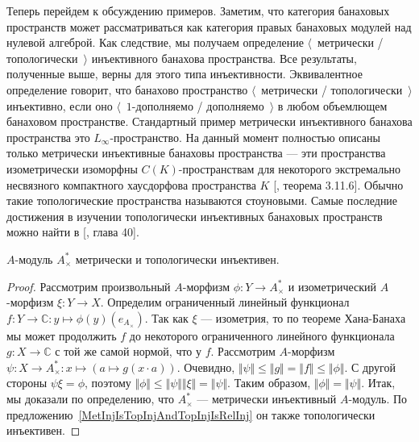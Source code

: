 Теперь перейдем к обсуждению примеров. Заметим, что категория банаховых
пространств может рассматриваться как категория правых банаховых модулей над
нулевой алгеброй. Как следствие, мы получаем определение $\langle$~метрически /
топологически~$\rangle$ инъективного банахова пространства. Все результаты,
полученные выше, верны для этого типа инъективности. Эквивалентное определение
говорит, что банахово пространство $\langle$~метрически /
топологически~$\rangle$ инъективно, если оно $\langle$~$1$-дополняемо /
дополняемо~$\rangle$ в любом объемлющем банаховом пространстве. Стандартный
пример метрически инъективного банахова пространства это
$L_\infty$-пространство. На данный момент полностью описаны только метрически
инъективные банаховы пространства --- эти пространства изометрически изоморфны
$C(K)$-пространствам для некоторого экстремально несвязного компактного
хаусдорфова пространства $K$ [\cite{LaceyIsomThOfClassicBanSp}, теорема 3.11.6].
Обычно такие топологические пространства называются стоуновыми. Самые последние
достижения в изучении топологически инъективных банаховых пространств можно
найти в [\cite{JohnLinHandbookGeomBanSp}, глава 40].

\begin{proposition}\label{DualOfUnitalAlgIsMetTopInj} $A$-модуль $A_\times^*$
метрически и топологически инъективен. 
\end{proposition}
\begin{proof} Рассмотрим произвольный $A$-морфизм $\phi:Y\to A_\times^*$ и
изометрический $A$-морфизм $\xi:Y\to X$. Определим ограниченный линейный
функционал $f:Y\to\mathbb{C}:y\mapsto \phi(y)(e_{A_\times})$. Так как $\xi$ ---
изометрия, то по теореме Хана-Банаха мы может продолжить $f$ до некоторого
ограниченного линейного функционала $g:X\to\mathbb{C}$ с той же самой нормой,
что у $f$. Рассмотрим $A$-морфизм $\psi:X\to A_\times^*:x\mapsto (a\mapsto
g(x\cdot a))$. Очевидно, $\Vert\psi\Vert\leq\Vert g\Vert=\Vert
f\Vert\leq\Vert\phi\Vert$. С другой стороны $\psi\xi=\phi$, поэтому
$\Vert\phi\Vert\leq\Vert\psi\Vert\Vert\xi\Vert=\Vert\psi\Vert$. Таким образом,
$\Vert\phi\Vert=\Vert\psi\Vert$. Итак, мы доказали по определению, что
$A_\times^*$ --- метрически инъективный $A$-модуль. По
предложению~\ref{MetInjIsTopInjAndTopInjIsRelInj} он также топологически
инъективен.
\end{proof}

